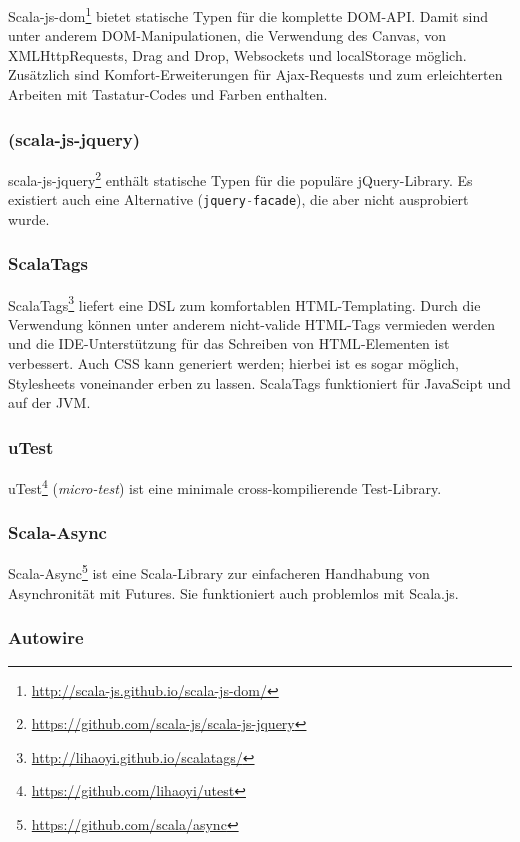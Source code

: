 \documentclass[a4paper, 12pt, hidelinks, listof=totoc, listoftables=totoc, bibliography=totoc]{scrreprt}
\newcommand{\code}[1]{\lstinline[language=Scala, style=inline]|#1|}
\begin{document}
Scala-js-dom\footnote{\url{http://scala-js.github.io/scala-js-dom/}} bietet statische Typen für die komplette \ac{DOM}-\ac{API}. Damit sind unter anderem DOM-Manipulationen, die Verwendung des Canvas, von XMLHttpRequests, Drag and Drop, Websockets und localStorage möglich. Zusätzlich sind Komfort-Erweiterungen für Ajax-Requests und zum erleichterten Arbeiten mit Tastatur-Codes und Farben enthalten.

\subsubsection{(scala-js-jquery)}

scala-js-jquery\footnote{\url{https://github.com/scala-js/scala-js-jquery}} enthält statische Typen für die populäre jQuery-Library. Es existiert auch eine Alternative (\code{jquery-facade}), die aber nicht ausprobiert wurde.

\subsubsection{ScalaTags}

ScalaTags\footnote{\url{http://lihaoyi.github.io/scalatags/}} liefert eine \ac{DSL} zum komfortablen \ac{HTML}-Templating. Durch die Verwendung können unter anderem nicht-valide \ac{HTML}-Tags vermieden werden und die \ac{IDE}-Unterstützung für das Schreiben von \ac{HTML}-Elementen ist verbessert. Auch CSS kann generiert werden; hierbei ist es sogar möglich, Stylesheets voneinander erben zu lassen. ScalaTags funktioniert für JavaScipt und auf der \ac{JVM}.

\subsubsection{uTest}

uTest\footnote{\url{https://github.com/lihaoyi/utest}} (\emph{micro-test}) ist eine minimale cross-kompilierende Test-Library.

\subsubsection{Scala-Async}

Scala-Async\footnote{\url{https://github.com/scala/async}} ist eine Scala-Library zur einfacheren Handhabung von Asynchronität mit Futures. Sie funktioniert auch problemlos mit Scala.js.

\subsubsection{Autowire}
\end{document}
